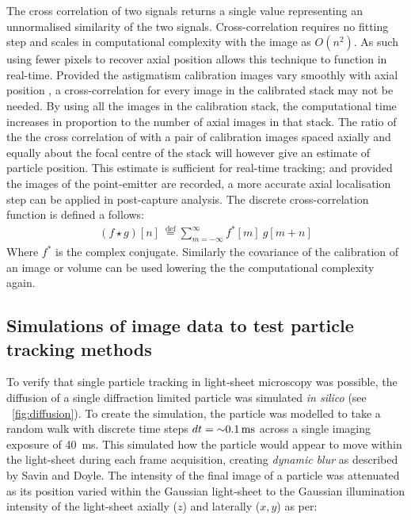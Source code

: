 The cross correlation of two signals returns a single value representing an unnormalised similarity of the two signals.
Cross-correlation requires no fitting step and scales in computational complexity with the image as $O(n^2)$.
As such using fewer pixels %
to recover axial position allows this technique to function in real-time.
Provided the astigmatism
calibration images vary smoothly with axial position
, a cross-correlation for every image in the calibrated stack may not be needed.
By using all the images in the calibration stack, the computational time increases in proportion to the number of axial images in that stack.
The ratio of the the cross correlation of with a pair of calibration images spaced axially and equally about the focal centre of the stack will however give an estimate of particle position.
This estimate is sufficient for real-time tracking; and provided the images of the point-emitter are recorded, a more accurate axial localisation step can be applied in post-capture analysis.
The discrete cross-correlation function is defined a follows:
\begin{align}
(f \star g)[n]\ \stackrel{\mathrm{def}}{=} \sum_{m=-\infty}^{\infty} f^*[m]\ g[m+n]
\end{align}
Where \(f^*\) is the complex conjugate.
Similarly the covariance of the calibration of an image or volume can be used lowering the the computational complexity again.

\subsection{Simulations of image data to test particle tracking methods}
To verify that single particle tracking in light-sheet microscopy was possible, the diffusion of a single diffraction limited particle was simulated \emph{in silico} (see \figurename~\ref{fig:diffusion}).
To create the simulation, the particle was modelled to take a random walk with discrete time steps \(dt=\SI{\sim0.1}{\milli\second}\) across a single imaging exposure of \SI{40}{\milli\second}.
This simulated how the particle would appear to move within the light-sheet during each frame acquisition, creating \emph{dynamic blur} as described by Savin and Doyle\cite{savinStaticDynamicErrors2005}.
The intensity of the final image of a particle was attenuated as its position varied within the Gaussian light-sheet to the Gaussian illumination intensity of the light-sheet axially (\(z\)) and laterally (\(x,y\)) as per:

